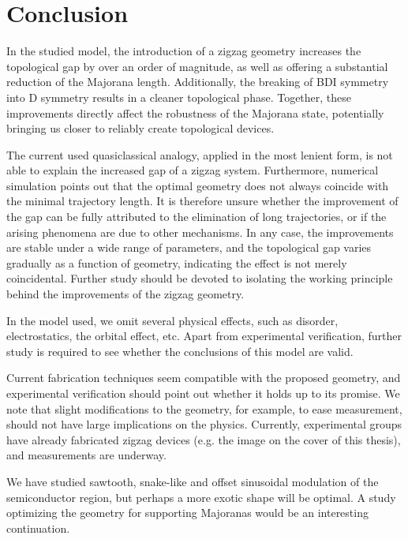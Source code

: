 \chapter{Conclusion}
In the studied model, the introduction of a zigzag geometry increases the topological gap by over an order of magnitude, as well as offering a substantial reduction of the Majorana length.
Additionally, the breaking of BDI symmetry into D symmetry results in a cleaner topological phase.
Together, these improvements directly affect the robustness of the Majorana state, potentially bringing us closer to reliably create topological devices.

The current used quasiclassical analogy, applied in the most lenient form, is not able to explain the increased gap of a zigzag system.
Furthermore, numerical simulation points out that the optimal geometry does not always coincide with the minimal trajectory length.
It is therefore unsure whether the improvement of the gap can be fully attributed to the elimination of long trajectories, or if the arising phenomena are due to other mechanisms.
In any case, the improvements are stable under a wide range of parameters, and the topological gap varies gradually as a function of geometry, indicating the effect is not merely coincidental.
Further study should be devoted to isolating the working principle behind the improvements of the zigzag geometry.

In the model used, we omit several physical effects, such as disorder, electrostatics, the orbital effect, etc.
Apart from experimental verification, further study is required to see whether the conclusions of this model are valid.

Current fabrication techniques seem compatible with the proposed geometry, and experimental verification should point out whether it holds up to its promise.
We note that slight modifications to the geometry, for example, to ease measurement, should not have large implications on the physics.
Currently, experimental groups have already fabricated zigzag devices (e.g. the image on the cover of this thesis), and measurements are underway.

We have studied sawtooth, snake-like and offset sinusoidal modulation of the semiconductor region, but perhaps a more exotic shape will be optimal.
A study optimizing the geometry for supporting Majoranas would be an interesting continuation.

